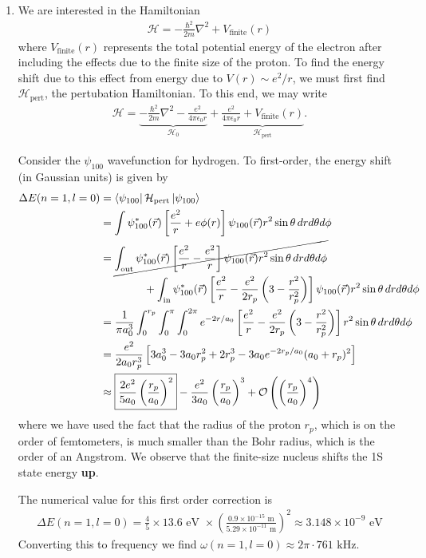 \documentclass{article}
\theoremstyle{definition}
\newcommand{\ham}{\mathcal{H}}
\newcommand{\f}[2]{\frac{#1}{#2}}
\newcommand{\lp}{\left(}
\newcommand{\rp}{\right)}
\newcommand{\lb}{\left[}
\newcommand{\rb}{\right]}
\begin{document}
\begin{enumerate}[label=(\alph*)]
	
	\item 
	We are interested in the Hamiltonian
	\begin{align*}
	\ham = -\f{\hbar^2}{2m} \nabla^2 + V_\text{finite}(r)
	\end{align*}
	where $V_\text{finite}(r)$ represents the total potential energy of the electron after including the effects due to the finite size of the proton. To find the energy shift due to this effect from energy due to $V(r) \sim e^2/r$, we must first find $\ham_\text{pert}$, the pertubation Hamiltonian. To this end, we may write
	\begin{align*}
	\ham = \underbrace{-\f{\hbar^2}{2m} \nabla^2 - \f{e^2}{4\pi \epsilon_0 r}}_{\ham_0} + \underbrace{\f{e^2}{4\pi \epsilon_0 r} + V_\text{finite}(r)}_{\ham_\text{pert}}.
	\end{align*}
	
	Consider the $\psi_{100}$ wavefunction for hydrogen. To first-order, the energy shift (in Gaussian units) is given by 
	\begin{align*}
	\Delta E(n=1,l=0) &= \bra{\psi_{100}} \ham_\text{pert} \ket{\psi_{100}} \\ 
	&= \int \psi_{100}^*(\vec{r}) \lb \f{e^2}{r} + e\phi(r)  \rb  \psi_{100}(\vec{r})  r^2\sin\theta \,dr d\theta d\phi  \\
	&= \cancel{\int_\text{out} \psi_{100}^*(\vec{r}) \lb \f{e^2}{r} - \f{e^2}{r}  \rb \psi_{100}(\vec{r}) r^2\sin\theta \,dr d\theta d\phi} \\
	&\quad\quad\quad\quad + \int_\text{in} \psi_{100}^*(\vec{r}) \lb \f{e^2}{r} - \f{e^2}{2r_p}\lp 3 - \f{r^2}{r_p^2} \rp  \rb \psi_{100}(\vec{r})  r^2\sin\theta \,dr d\theta d\phi \\
	&= \f{1}{\pi a_0^3}\int_0^{r_p} \int_0^{\pi}\int_0^{2\pi} e^{-2r/a_0} \lb \f{e^2}{r} - \f{e^2}{2r_p}\lp 3 - \f{r^2}{r_p^2} \rp  \rb  r^2 \sin\theta\,dr d\theta d\phi \\
	&= \f{e^2}{2a_0 r_p^3}\lb 3a_0^3 - 3a_0 r_p^2 + 2r_p^3 - 3a_0 e^{-2r_p/a_0}(a_0 + r_p)^2 \rb \\
	&\approx \boxed{\f{2e^2}{5a_0} \lp \f{r_p}{a_0} \rp^2} - \f{e^2}{3a_0}\lp \f{r_p}{a_0} \rp^3 + \mathcal{O}\lp \lp \f{r_p}{a_0}\rp ^4\rp 
	\end{align*}
	where we have used the fact that the radius of the proton $r_p$, which is on the order of femtometers, is much smaller than the Bohr radius, which is the order of an Angstrom.  We observe that the finite-size nucleus shifts the 1S  state energy \textbf{up}. 
	
	
	The numerical value for this first order correction is
	\begin{align*}
	\Delta E(n=1,l=0) = \f{4}{5} \times 13.6 \text{ eV } \times  \lp \f{0.9 \times 10^{-15} \text{ m}}{5.29 \times 10^{-11} \text{ m}} \rp^2 \approx \boxed{3.148 \times 10^{-9} \text{ eV}} 
	\end{align*}
	Converting this to frequency we find $\omega (n=1,l=0) \approx 2\pi \cdot 761 \text{ kHz}$. \\
	

\end{enumerate}
\end{document}

